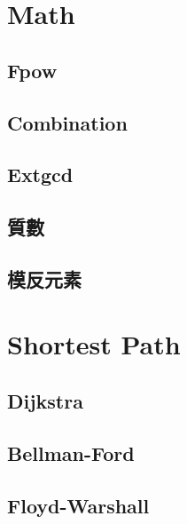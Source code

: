 \documentclass[a4paper,10pt,twocolumn,oneside]{article}
\begin{document}
\pagestyle{fancy}

\fancyhead[R]{\thepage}
\renewcommand{\headrulewidth}{0.4pt}
\renewcommand{\contentsname}{Contents} 

\scriptsize
\tableofcontents


\section{Math}
\subsection{Fpow}


\subsection{Combination}


\subsection{Extgcd}


\subsection{質數}


\subsection{模反元素}


\section{Shortest Path}
\subsection{Dijkstra}


\subsection{Bellman-Ford}


\subsection{Floyd-Warshall}

\end{document}
